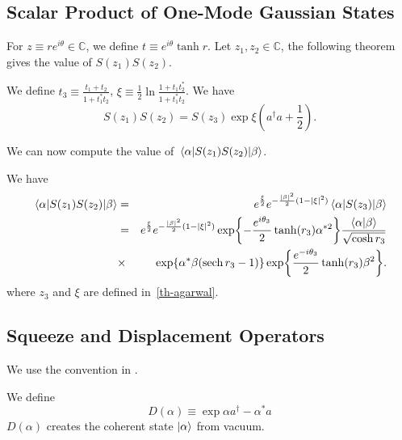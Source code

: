 \subsection{Scalar Product of One-Mode Gaussian States}
For $z \equiv r e^{i \theta} \in \mathbb{C}$, we define $t \equiv e^{i \theta} \tanh{r}$. Let $z_1, z_2 \in \mathbb{C}$, the following theorem~\cite{Agarwal-book} gives the value of $S(z_1) S(z_2)$.

\begin{theorem} \label{th-agarwal}
    We define $t_3 \equiv \frac{t_1 + t_2}{1 + t^*_1 t_2}$, $\xi \equiv \frac{1}{2} \ln{\frac{1 + t_1 t^*_2}{1 + t^*_1 t_2}}$. We have
    \begin{equation}
        S(z_1) S(z_2) = S(z_3) \exp{\xi \left(a^\dagger a + \frac{1}{2}\right)}.
    \end{equation}
\end{theorem}

We can now compute the value of $\mel{\alpha}{S(z_1) S(z_2)}{\beta}$. 

\begin{theorem}
    We have
    \begin{eqnarray} \label{overlap-2-dq}
        \mel{\alpha}{S(z_1) S(z_2)}{\beta} &=& e^{\frac{\xi}{2}} e^{-\frac{|\beta|^2}{2}(1-|\xi|^2)} \mel{\alpha}{S(z_3)}{\beta}\\ 
        &=& e^{\frac{\xi}{2}} e^{-\frac{|\beta|^2}{2}(1-|\xi|^2)} \exp{-\frac{e^{i \theta_3}}{2} \tanh(r_3) \alpha^{* 2}} \frac{\braket{\alpha}{\beta}}{\sqrt{\cosh{r_3}}} \nonumber\\
        &\times& \exp{\alpha^* \beta (\sech{r_3} - 1)} \exp{\frac{e^{-i \theta_3}}{2} \tanh(r_3) \beta^2}.
    \end{eqnarray}
    where $z_3$ and $\xi$ are defined in~\autoref{th-agarwal}.
\end{theorem}

\subsection{Squeeze and Displacement Operators}

We use the convention in \cite{dynamiqs-displace, squeeze_normal_order}.
\begin{definition}
We define
    \begin{equation}
        D(\alpha) \equiv \exp{\alpha a^\dagger - \alpha^* a}
    \end{equation}
    $D(\alpha)$ creates the coherent state $\ket{\alpha}$ from vacuum. 
\end{definition}


